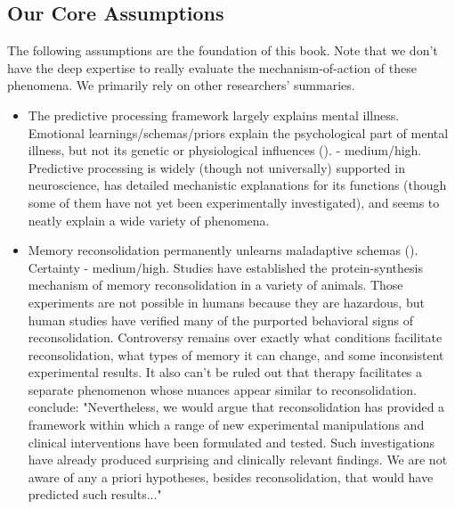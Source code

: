 \documentclass[12pt,letterpaper]{book}
\begin{document}
\subsection*{Our Core Assumptions}
The following assumptions are the foundation of this book. Note that we don't have the deep expertise to really evaluate the mechanism-of-action of these phenomena. We primarily rely on other researchers' summaries.
\begin{itemize}
	\item The predictive processing framework largely explains mental illness. Emotional learnings/schemas/priors explain the psychological part of mental illness, but not its genetic or physiological influences (\textcite{aizenbud2025neuralmechanismspredictiveprocessing,clark2015surfing,Clark_Watson_Friston_2018,eckerUnlocking,laneReconsolidation}). - medium/high. Predictive processing is widely (though not universally) supported in neuroscience, has detailed mechanistic explanations for its functions (though some of them have not yet been experimentally investigated), and seems to neatly explain a wide variety of phenomena.
	\item Memory reconsolidation permanently unlearns maladaptive schemas (\textcite{eckerUnlocking,laneReconsolidation,elsey2018human}). Certainty - medium/high. Studies have established the protein-synthesis mechanism of memory reconsolidation in a variety of animals. Those experiments are not possible in humans because they are hazardous, but human studies have verified many of the purported behavioral signs of reconsolidation. Controversy remains over exactly what conditions facilitate reconsolidation, what types of memory it can change, and some inconsistent experimental results. It also can't be ruled out that therapy facilitates a separate phenomenon whose nuances appear similar to reconsolidation. \textcite{elsey2018human} conclude: "Nevertheless, we would argue that reconsolidation has provided a framework within which a range of new experimental manipulations and clinical interventions have been formulated and tested. Such investigations have already produced surprising and clinically relevant findings. We are not aware of any a priori hypotheses, besides reconsolidation, that would have predicted such results..."

\end{itemize}
\end{document}
